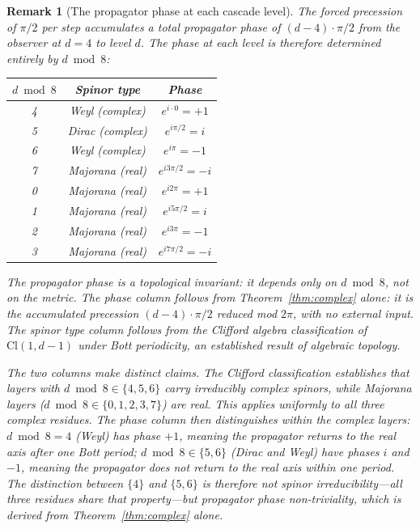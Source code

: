 \documentclass[12pt,a4paper]{article}
\newtheorem{remark}[theorem]{Remark}
\begin{document}
\begin{remark}[The propagator phase at each cascade level]\label{rem:bott-phases}
The forced precession of $\pi/2$ per step accumulates a total propagator phase of
$(d-4)\cdot\pi/2$ from the observer at $d=4$ to level $d$. The phase at each level is
therefore determined entirely by $d\bmod 8$:
\begin{center}
\begin{tabular}{ccc}
\toprule
$d\bmod 8$ & Spinor type & Phase \\
\midrule
4 & Weyl (complex) & $e^{i\cdot 0} = +1$ \\
5 & Dirac (complex) & $e^{i\pi/2} = i$ \\
6 & Weyl (complex) & $e^{i\pi} = -1$ \\
7 & Majorana (real) & $e^{i3\pi/2} = -i$ \\
0 & Majorana (real) & $e^{i2\pi} = +1$ \\
1 & Majorana (real) & $e^{i5\pi/2} = i$ \\
2 & Majorana (real) & $e^{i3\pi} = -1$ \\
3 & Majorana (real) & $e^{i7\pi/2} = -i$ \\
\bottomrule
\end{tabular}
\end{center}
The propagator phase is a topological invariant: it depends only on $d\bmod 8$, not on the
metric. The phase column follows from Theorem~\ref{thm:complex} alone: it is the accumulated
precession $(d-4)\cdot\pi/2$ reduced mod $2\pi$, with no external input. The spinor type
column follows from the Clifford algebra classification of $\mathrm{Cl}(1,d-1)$ under Bott
periodicity, an established result of algebraic topology.

The two columns make distinct claims. The Clifford classification establishes that layers
with $d\bmod 8\in\{4,5,6\}$ carry irreducibly complex spinors, while Majorana layers
($d\bmod 8\in\{0,1,2,3,7\}$) are real. This applies uniformly to all three complex residues.
The phase column then distinguishes within the complex layers: $d\bmod 8=4$ (Weyl) has
phase $+1$, meaning the propagator returns to the real axis after one Bott period;
$d\bmod 8\in\{5,6\}$ (Dirac and Weyl) have phases $i$ and $-1$, meaning the propagator
does not return to the real axis within one period. The distinction between $\{4\}$ and
$\{5,6\}$ is therefore not spinor irreducibility---all three residues share that
property---but propagator phase non-triviality, which is derived from
Theorem~\ref{thm:complex} alone.
\end{remark}
\end{document}
